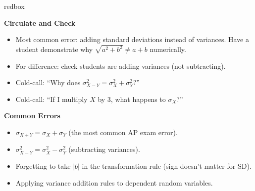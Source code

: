 \documentclass[10pt]{article}
\begin{document}
\begin{skillbox}{redbox}
\begin{minipage}[t]{0.48\linewidth}
    \textbf{Circulate and Check}
    \begin{itemize}
        \item Most common error: adding standard deviations instead of variances.
              Have a student demonstrate why $\sqrt{a^2+b^2} \ne a+b$ numerically.
        \item For difference: check students are adding variances (not subtracting).
        \item Cold-call: ``Why does $\sigma^2_{X-Y} = \sigma^2_X + \sigma^2_Y$?''
        \item Cold-call: ``If I multiply $X$ by 3, what happens to $\sigma_X$?''
    \end{itemize}
\end{minipage}
\hfill
\begin{minipage}[t]{0.48\linewidth}
    \textbf{Common Errors}
    \begin{itemize}
        \item $\sigma_{X+Y} = \sigma_X + \sigma_Y$ (the most common AP exam error).
        \item $\sigma^2_{X-Y} = \sigma^2_X - \sigma^2_Y$ (subtracting variances).
        \item Forgetting to take $|b|$ in the transformation rule (sign doesn't matter
              for SD).
        \item Applying variance addition rules to dependent random variables.
    \end{itemize}
\end{minipage}
\end{skillbox}
\end{document}

